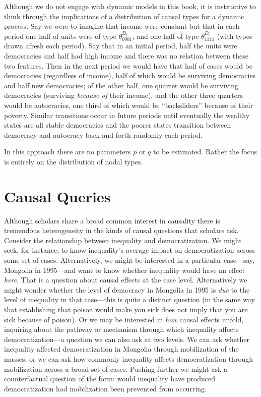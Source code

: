 \documentclass[
  12pt,
]{book}
\begin{document}
Although we do not engage with dynamic models in this book, it is instructive to think through the implications of a distribution of causal types for a dynamic process. Say we were to imagine that income were constant but that in each period one half of units were of type \(\theta^{D_t}_{0001}\), and one half of type \(\theta^{D_t}_{1111}\) (with types drawn afresh each period). Say that in an initial period, half the units were democracies and half had high income and there was no relation between these two features. Then in the next period we would have that
half of cases would be democracies (regardless of income), half of which would be surviving democracies and half new democracies; of the other half, one quarter would be surviving democracies (surviving \emph{because of} their income), and the other three quarters would be autocracies, one third of which would be ``backsliders'' because of their poverty. Similar transitions occur in future periods until eventually the wealthy states are all stable democracies and the poorer states transition between democracy and autocracy back and forth randomly each period.

In this approach there are no parameters \(p\) or \(q\) to be estimated. Rather the focus is entirely on the distribution of nodal types.

\hypertarget{questions}{%
\chapter{Causal Queries}\label{questions}}

Although scholars share a broad common interest in causality there is tremendous heterogeneity in the kinds of causal questions that scholars ask. Consider the relationship between inequality and democratization. We might seek, for instance, to know inequality's average impact on democratization across some set of cases. Alternatively, we might be interested in a particular case---say, Mongolia in 1995---and want to know whether inequality would have an effect \emph{here}. That is a question about causal effects at the case level. Alternatively we might wonder whether the level of democracy in Mongolia in 1995 is \emph{due} to the level of inequality in that case---this is quite a distinct question (in the same way that establishing that poison would make you sick does not imply that you are sick because of poison). Or we may be interested in \emph{how} causal effects unfold, inquiring about the pathway or mechanism through which inequality affects democratization---a question we can also ask at two levels. We can ask whether inequality affected democratization in Mongolia through mobilization of the masses; or we can ask how commonly inequality affects democratization through mobilization across a broad set of cases. Pushing further we might ask a counterfactual question of the form: would inequality have produced democratization had mobilization been prevented from occurring.
\end{document}
